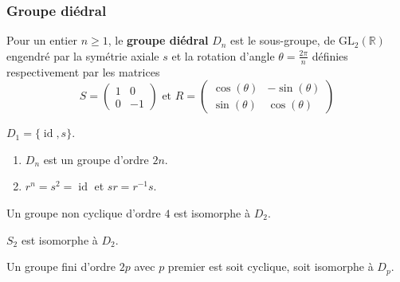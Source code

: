   \subsubsection{Groupe diédral}


  \begin{definition}
    Pour un entier $n \geq 1$, le \textbf{groupe diédral} $D_n$ est le sous-groupe, de $\mathrm{GL}_2(\mathbb{R})$ engendré par la symétrie axiale $s$ et la rotation d'angle $\theta = \frac{2\pi}{n}$ définies respectivement par les matrices
    \[
    S =
    \begin{pmatrix}
      1 & 0 \\
      0 & -1
    \end{pmatrix}
    \text{ et }
    R =
    \begin{pmatrix}
      \cos(\theta) & -\sin(\theta) \\
      \sin(\theta) & \cos(\theta)
    \end{pmatrix}
    \]
  \end{definition}

  \begin{example}
    $D_1 = \{ \operatorname{id}, s \}$.
  \end{example}

  \begin{proposition}
    \begin{enumerate}[label=(\roman*)]
      \item $D_n$ est un groupe d'ordre $2n$.
      \item $r^n = s^2 = \operatorname{id}$ et $sr = r^{-1}s$.
    \end{enumerate}
  \end{proposition}


  \begin{proposition}
    Un groupe non cyclique d'ordre $4$ est isomorphe à $D_2$.
  \end{proposition}


  \begin{example}
    $S_2$ est isomorphe à $D_2$.
  \end{example}


  \begin{proposition}
    Un groupe fini d'ordre $2p$ avec $p$ premier est soit cyclique, soit isomorphe à $D_p$.
  \end{proposition}

